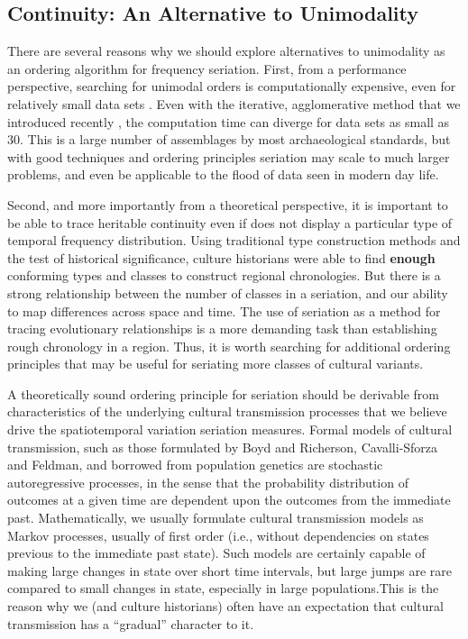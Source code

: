 \documentclass[graybox,natbib]{svmult}
\begin{document}
\subsection{Continuity: An Alternative to
Unimodality}\label{continuity-an-alternative-to-unimodality}

There are several reasons why we should explore alternatives to
unimodality as an ordering algorithm for frequency seriation. First,
from a performance perspective, searching for unimodal orders is
computationally expensive, even for relatively small data sets
\citep{Madsen2014}. Even with the iterative, agglomerative method that
we introduced recently \citep{lipomadsendunnell2015}, the computation
time can diverge for data sets as small as 30. This is a large number of
assemblages by most archaeological standards, but with good techniques
and ordering principles seriation may scale to much larger problems, and
even be applicable to the flood of data seen in modern day life.

Second, and more importantly from a theoretical perspective, it is
important to be able to trace heritable continuity even if does not
display a particular type of temporal frequency distribution. Using
traditional type construction methods and the test of historical
significance, culture historians were able to find \textbf{enough}
conforming types and classes to construct regional chronologies. But
there is a strong relationship between the number of classes in a
seriation, and our ability to map differences across space and time. The
use of seriation as a method for tracing evolutionary relationships is a
more demanding task than establishing rough chronology in a region.
Thus, it is worth searching for additional ordering principles that may
be useful for seriating more classes of cultural variants.

A theoretically sound ordering principle for seriation should be
derivable from characteristics of the underlying cultural transmission
processes that we believe drive the spatiotemporal variation seriation
measures. Formal models of cultural transmission, such as those
formulated by Boyd and Richerson, Cavalli-Sforza and Feldman, and
borrowed from population genetics
\citep{Boyd1985, Cavalli-Sforza1981, Neiman1995} are stochastic
autoregressive processes, in the sense that the probability distribution
of outcomes at a given time are dependent upon the outcomes from the
immediate past. Mathematically, we usually formulate cultural
transmission models as Markov processes, usually of first order (i.e.,
without dependencies on states previous to the immediate past state).
Such models are certainly capable of making large changes in state over
short time intervals, but large jumps are rare compared to small changes
in state, especially in large populations.This is the reason why we (and
culture historians) often have an expectation that cultural transmission
has a ``gradual'' character to it.
\end{document}
